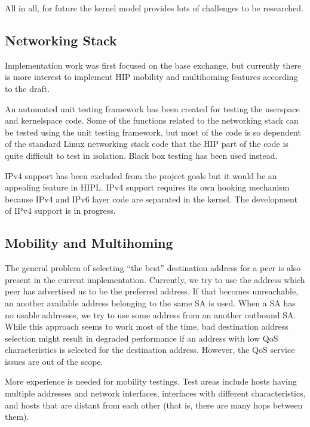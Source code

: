 All in all, for future the kernel model provides lots of challenges to
be researched.

\subsection{Networking Stack}
\label{sec:networking_stack_future_work}

Implementation work was first focused on the base exchange, but
currently there is more interest to implement \ac{HIP} mobility and
multihoming features according to the \cite{hip-ietf-mm-00} draft.

An automated unit testing framework has been created for testing the
userspace and kernelspace code. Some of the functions related to the
networking stack can be tested using the unit testing framework, but
most of the code is so dependent of the standard Linux networking
stack code that the \ac{HIP} part of the code is quite difficult to
test in isolation. Black box testing has been used instead.

IPv4 support has been excluded from the project goals but it would be
an appealing feature in \ac{HIPL}. IPv4 support requires its own
hooking mechanism because IPv4 and IPv6 layer code are separated in
the kernel. The development of IPv4 support is in progress.

\subsection{Mobility and Multihoming}
\label{sec:future_mobility_and_multihoming}

The general problem of selecting ``the best'' destination address for
a peer is also present in the current implementation. Currently, we
try to use the address which peer has advertised us to be the
preferred address. If that becomes unreachable, an another available
address belonging to the same \ac{SA} is used. When a \ac{SA} has no
usable addresses, we try to use some address from an another outbound
\ac{SA}. While this approach seems to work most of the time, bad destination
address selection might result in degraded performance if an address
with low \ac{QoS} characteristics is selected for the destination
address. However, the \ac{QoS} service issues are out of the scope.

More experience is needed for mobility testings. Test areas include
hosts having multiple addresses and network interfaces, interfaces
with different characteristics, and hosts that are distant from each
other (that is, there are many hops between them).

